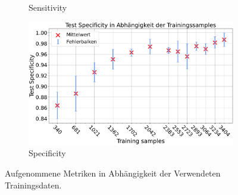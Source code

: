 \begin{figure}[htbp]
\begin{subfigure}[b]{0.48\textwidth}
    \caption{Sensitivity}
    \label{fig:reduzierung_sensitivity}
  \end{subfigure}
  \begin{subfigure}[b]{0.48\textwidth}
    \includegraphics[width=\textwidth]{plots/2-Messungen-noTu-Tu_Specificity_mean.pdf}
    \caption{Specificity}
    \label{fig:reduzierung_specificity}
  \end{subfigure}
  \caption{Aufgenommene Metriken in Abhängigkeit der Verwendeten Trainingsdaten.}
  \label{fig:reduzierung_trainingsdaten}
\end{figure}

